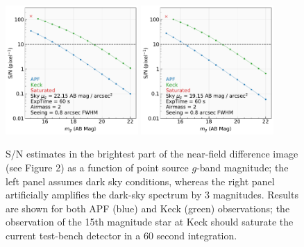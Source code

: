 \documentclass[onecolumn,floatfix,tighten]{aastex62}
\begin{document}
\begin{figure}
\begin{center}
\includegraphics[width=0.45\textwidth]{fiddles_etc_dark.pdf}
\includegraphics[width=0.45\textwidth]{fiddles_etc_bright.pdf}
\end{center}
\caption{S/N estimates in the brightest part of the near-field
difference image (see Figure 2) as a function of point source
$g$-band magnitude; the left panel assumes dark sky conditions,
whereas the right panel artificially amplifies the dark-sky spectrum
by 3 magnitudes. Results are shown for both APF (blue) and Keck
(green) observations; the observation of the 15th magnitude star at
Keck should saturate the current test-bench detector in a 60 second
integration.}
\label{fig:snr}
\end{figure}
\end{document}
